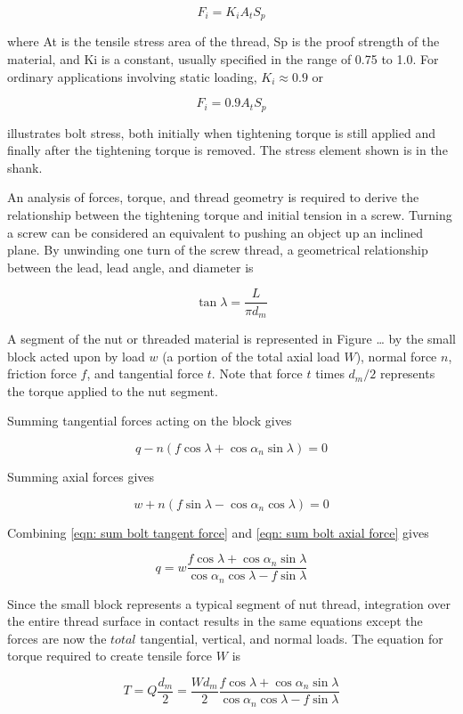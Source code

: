 \documentclass[a4paper,openany,nobib]{tufte-book}
\begin{document}
{{$$F_i = K_iA_tS_p$$

where At is the tensile stress area of the thread, Sp is the proof
strength of the material, and Ki is a constant, usually specified in the
range of 0.75 to 1.0. For ordinary applications involving static
loading, \(K_i \approx 0.9\) or

$$F_i = 0.9A_tS_p$$

illustrates bolt stress, both initially when tightening torque is still
applied and finally after the tightening torque is removed. The stress
element shown is in the shank.


An analysis of forces, torque, and thread geometry is required to derive
the relationship between the tightening torque and initial tension in a
screw. Turning a screw can be considered an equivalent to pushing an
object up an inclined plane. By unwinding one turn of the screw thread,
a geometrical relationship between the lead, lead angle, and diameter is

$$\tan \lambda  = \frac{L}{\pi d_m}$$

A segment of the nut or threaded material is represented in Figure \ldots{}
by the small block acted upon by load \(w\) (a portion of the total axial
load \(W\)), normal force \(n\), friction force \(f\), and tangential force
\(t\). Note that force \(t\) times \(d_m/2\) represents the torque applied to
the nut segment.

Summing tangential forces acting on the block gives

$$q - n(f\cos \lambda  + \cos \alpha_n\sin \lambda ) = 0$$

Summing axial forces gives

$$w + n(f\sin \lambda  - \cos \alpha_n\cos \lambda ) = 0$$

Combining
\ref{eqn: sum bolt tangent force} and \ref{eqn: sum bolt axial force} gives

$$q = w\frac{f\cos \lambda + \cos \alpha_n\sin \lambda }{\cos \alpha_n\cos \lambda  - f\sin \lambda }$$

Since the small block represents a typical segment of nut thread,
integration over the entire thread surface in contact results in the
same equations except the forces are now the \(total\) tangential,
vertical, and normal loads. The equation for torque required to create
tensile force \(W\) is

$$T = Q\frac{d_m}{2} = \frac{Wd_m}{2}\frac{f\cos \lambda + \cos \alpha_n\sin \lambda }{\cos \alpha_n\cos \lambda - f\sin \lambda }$$

}}
\end{document}

